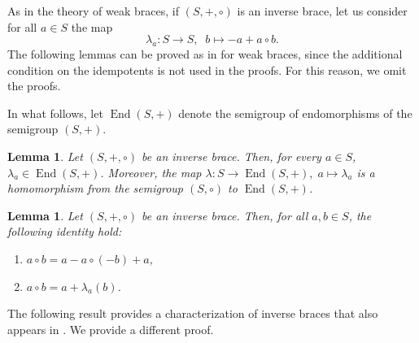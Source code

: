 \documentclass[preprint,1p]{elsarticle}
\newtheorem{lemma}[theor]{Lemma}
\theoremstyle{definition}               %
\DeclareMathOperator{\End}{End}
\begin{document}
\medskip
As in the theory of weak braces, if $(S, +, \circ)$ is an inverse brace, let us consider for all $a \in S$ the map
	$$
	\lambda_a:S\rightarrow S, \;\; b\mapsto -a + a\circ b.
	$$
The following lemmas can be proved as in \cite{CaMaMiSt22} for weak braces, since the additional condition on the idempotents is not used in the proofs. For this reason, we omit the proofs.

In what follows, let 
$\End(S,+)$ denote the semigroup of endomorphisms of the semigroup $(S,+)$.

\begin{lemma}\label{key2.4}
Let $(S,+,\circ)$ be an inverse brace. Then, for every $a\in S$, $\lambda_a \in \End(S,+)$. Moreover, the map $\lambda: S \rightarrow \End(S,+),\; a \mapsto \lambda_a$ is a homomorphism from the semigroup $(S,\circ)$ to $\End(S,+)$.
\end{lemma}

\smallskip

\begin{lemma}\label{lemma_ab}
Let $(S,+,\circ)$ be an inverse brace. Then, for all $a,b\in S$, the following identity hold:
\begin{enumerate}
\item[\rm{(1)}] $a\circ b= a - a\circ (-b)+a$,
\item[\rm{(2)}] $a\circ b = a+\lambda_a(b)$.
\end{enumerate}
\end{lemma}

\smallskip 

The following result provides a characterization of inverse braces that also appears in \cite[Proposition 3.1]{Wang25x}. We provide a different proof.
\end{document}
